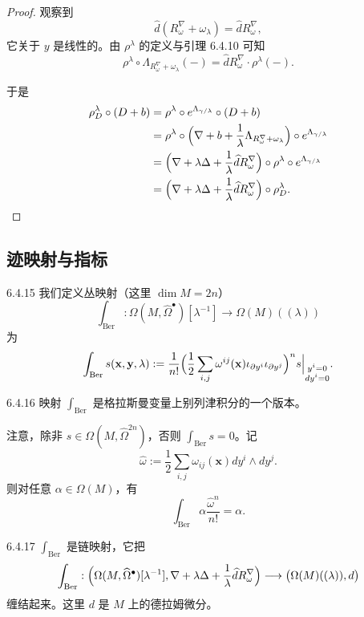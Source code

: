 \begin{proof}
  观察到
  \[
  \widehat d(R_\omega^\nabla+\omega_\lambda)=\widehat dR_\omega^\nabla,
  \]
  它关于 $y$ 是线性的。由 $\rho^\lambda$ 的定义与引理 6.4.10 可知
  \[
  \rho^\lambda\circ\Lambda_{R_\omega^\nabla+\omega_\lambda}(-)
  =\widehat dR_\omega^\nabla\cdot\rho^\lambda(-).
  \]

于是
\begin{align*}
\rho_D^\lambda\circ(D+b)
&=\rho^\lambda\circ e^{\Lambda_{\gamma/\lambda}}\circ(D+b)\\
&=\rho^\lambda\circ\Bigl(\nabla+b+\frac1\lambda
\Lambda_{R_\omega^\nabla+\omega_\lambda}\Bigr)
\circ e^{\Lambda_{\gamma/\lambda}}\\
&=\Bigl(\nabla+\lambda\Delta+\frac1\lambda\widehat dR_\omega^\nabla\Bigr)
\circ\rho^\lambda\circ e^{\Lambda_{\gamma/\lambda}}\\
&=\Bigl(\nabla+\lambda\Delta+\frac1\lambda\widehat dR_\omega^\nabla\Bigr)
\circ\rho_D^\lambda.
\end{align*}
\end{proof}

\subsection{迹映射与指标}

\begin{definition}{6.4.15}
  我们定义丛映射（这里 $\dim M=2n$）
  \[
  \int_{\mathrm{Ber}}:\Omega(M,\widehat\Omega^\bullet)[\lambda^{-1}]
  \longrightarrow\Omega(M)((\lambda))
  \]
  为
  \[
  \int_{\mathrm{Ber}}s(\mathbf x,\mathbf y,\lambda)
  :=\frac{1}{n!}
  \Bigl(\frac12\sum_{i,j}\omega^{ij}(\mathbf x)
  \iota_{\partial y^i}\iota_{\partial y^j}\Bigr)^n
  s\Big|_{\substack{y^i=0\\ dy^i=0}}.
  \]
\end{definition}

\begin{remark}{6.4.16}
  映射 $\int_{\mathrm{Ber}}$ 是格拉斯曼变量上别列津积分的一个版本。

  注意，除非 $s\in\Omega(M,\widehat\Omega^{2n})$，否则 $\int_{\mathrm{Ber}}s=0$。记
  \[
  \widehat\omega:=\frac12\sum_{i,j}\omega_{ij}(\mathbf x)dy^i\wedge dy^j.
  \]
  则对任意 $\alpha\in\Omega(M)$，有
  \[
  \int_{\mathrm{Ber}}\alpha\frac{\widehat\omega^n}{n!}=\alpha.
  \]
\end{remark}

\begin{proposition}{6.4.17}
  $\int_{\mathrm{Ber}}$ 是链映射，它把
  \[
  \int_{\mathrm{Ber}}:
  \Bigl(\Omega(M,\widehat\Omega^\bullet)[\lambda^{-1}],
  \nabla+\lambda\Delta+\frac1\lambda\widehat dR_\omega^\nabla\Bigr)
  \longrightarrow\bigl(\Omega(M)((\lambda)),d\bigr)
  \]
  缠结起来。这里 $d$ 是 $M$ 上的德拉姆微分。
\end{proposition}

